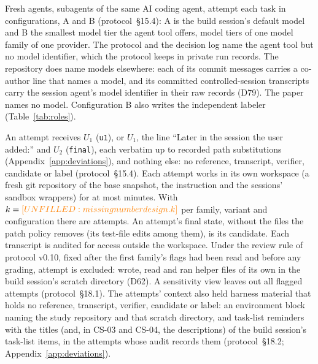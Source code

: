 Fresh agents, subagents of the same AI coding agent, attempt each task in  configurations, A and B (protocol~\S15.4): A is the build session's default model and B the smallest model tier the agent tool offers,  model tiers of one model family of one provider. The protocol and the decision log name the agent tool but no model identifier, which the protocol keeps in private run records. The repository does name models elsewhere: each of its commit messages carries a co-author line that names a model, and its committed controlled-session transcripts carry the session agent's model identifier in their raw records (D79). The paper names no model. Configuration B also writes the independent labeler (Table~\ref{tab:roles}).

An attempt receives $U_1$ (\texttt{u1}), or $U_1$, the line ``Later in the session the user added:'' and $U_2$ (\texttt{final}), each verbatim up to recorded path substitutions (Appendix~\ref{app:deviations}), and nothing else: no reference, transcript, verifier, candidate or label (protocol~\S15.4). Each attempt works in its own workspace (a fresh git repository of the base snapshot, the instruction and the sessions' sandbox wrappers) for at most  minutes. With $k=\dv{design.k}$ per family, variant and configuration there are  attempts. An attempt's final state, without the files the patch policy removes (its test-file edits among them), is its candidate. Each transcript is audited for access outside the workspace. Under the review rule of protocol v0.10, fixed after the first family's flags had been read and before any grading,  attempt is excluded: \texttt{} wrote, read and ran helper files of its own in the build session's scratch directory (D62). A sensitivity view leaves out all  flagged attempts (protocol~\S18.1). The attempts' context also held harness material that holds no reference, transcript, verifier, candidate or label: an environment block naming the study repository and that scratch directory, and task-list reminders with the titles (and, in CS-03 and CS-04, the descriptions) of the build session's task-list items, in the attempts whose audit records them (protocol~\S18.2; Appendix~\ref{app:deviations}).

